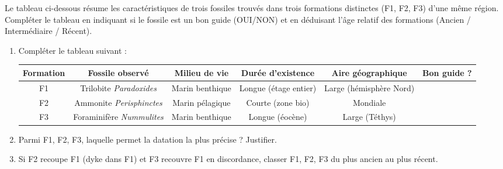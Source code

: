 \documentclass[11pt]{article}
\begin{document}
\begin{exercice}
Le tableau ci-dessous résume les caractéristiques de trois fossiles trouvés dans trois formations distinctes (F1, F2, F3) d'une même région. Compléter le tableau en indiquant si le fossile est un bon guide (OUI/NON) et en déduisant l'âge relatif des formations (Ancien / Intermédiaire / Récent).
\begin{enumerate}
    \item Compléter le tableau suivant :
    \begin{tabular}{|c|c|c|c|c|c|}
    \hline
    \textbf{Formation} & \textbf{Fossile observé} & \textbf{Milieu de vie} & \textbf{Durée d'existence} & \textbf{Aire géographique} & \textbf{Bon guide ?} \\
    \hline
    F1 & Trilobite \textit{Paradoxides} & Marin benthique & Longue (étage entier) & Large (hémisphère Nord) &  \\
    \hline
    F2 & Ammonite \textit{Perisphinctes} & Marin pélagique & Courte (zone bio) & Mondiale &  \\
    \hline
    F3 & Foraminifère \textit{Nummulites} & Marin benthique & Longue (éocène) & Large (Téthys) &  \\
    \hline
    \end{tabular}
    \item Parmi F1, F2, F3, laquelle permet la datation la plus précise ? Justifier.
    \item Si F2 recoupe F1 (dyke dans F1) et F3 recouvre F1 en discordance, classer F1, F2, F3 du plus ancien au plus récent.
\end{enumerate}
\end{exercice}
\end{document}
